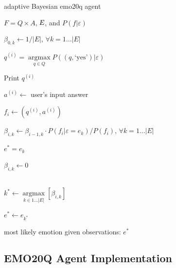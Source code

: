 \documentclass[a4paper]{article}
\begin{document}
\begin{algorithm}
  \caption{adaptive Bayesian emo20q agent}
  \label{A:Agent}
  \begin{algorithmic}
    
    $F=Q \times A$, $\textsl{E}$, and $P(f|\varepsilon)$
    
     \STATE $\beta_{0,k} \leftarrow 1/|E|$, $\forall k=1...|E|$
    
    
    \STATE $q^{(i)} = \underset{q \in Q}{\operatorname{argmax}}  P((q, \text{`yes'}) |\varepsilon)$
    
    \STATE Print $q^{(i)}$
    
    \STATE $a^{(i)} \leftarrow$ user's input answer
    
    \STATE $f_i \leftarrow (q^{(i)},a^{(i)}) $ 
    
    \STATE  $\beta_{i,k} \leftarrow \beta_{i-1,k} \cdot P(f_i|\varepsilon=e_k) / P(f_i)$, $\forall k=1...|E|$ 
    
    
     $e^* = e_k$
    
    \ENDIF
    
    
    \STATE $\beta_{i,k}\leftarrow 0$  

    \ENDIF
    
    \ENDFOR\\
    
    \STATE $k^*  \leftarrow \underset{k \in 1...|E|}{\operatorname{argmax}} [ \beta_{i,k} ]$
    
    \STATE $e^* \leftarrow e_{k^*}$
    
      most likely emotion given observations: $e^*$

  \end{algorithmic}
\end{algorithm}

\subsection{EMO20Q Agent Implementation}
\end{document}
